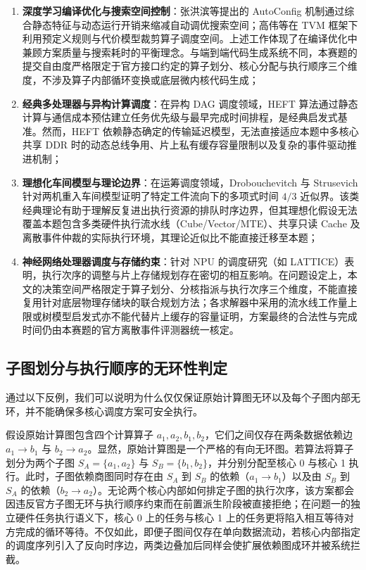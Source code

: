 \documentclass[anonymous,withtoc]{gmcm2026}
\providecommand{\tightlist}{\setlength{\itemsep}{0pt}\setlength{\parskip}{0pt}}
\begin{document}
\begin{enumerate}
\def\labelenumi{\arabic{enumi}.}
\tightlist
\item
  \textbf{深度学习编译优化与搜索空间控制}：张洪滨等提出的 AutoConfig 机制\cite{ref13}通过综合静态特征与动态运行开销来缩减自动调优搜索空间；高伟等在 TVM 框架下\cite{ref14}利用预定义规则与代价模型裁剪算子调度空间。上述工作体现了在编译优化中兼顾方案质量与搜索耗时的平衡理念。与端到端代码生成系统不同，本赛题的提交自由度严格限定于官方接口约定的算子划分、核心分配与执行顺序三个维度，不涉及算子内部循环变换或底层微内核代码生成；
\item
  \textbf{经典多处理器与异构计算调度}：在异构 DAG 调度领域，HEFT 算法\cite{ref15}通过静态计算与通信成本预估建立任务优先级与最早完成时间排程，是经典启发式基准。然而，HEFT 依赖静态确定的传输延迟模型，无法直接适应本题中多核心共享 DDR 时的动态总线争用、片上私有缓存容量限制以及复杂的事件驱动推进机制；
\item
  \textbf{理想化车间模型与理论边界}：在运筹调度领域，Drobouchevitch 与 Strusevich 针对两机重入车间模型\cite{ref16}证明了特定工件流向下的多项式时间 \(4/3\) 近似界。该类经典理论有助于理解反复进出执行资源的排队时序边界，但其理想化假设无法覆盖本题包含多类硬件执行流水线（Cube/Vector/MTE）、共享只读 Cache 及离散事件仲裁的实际执行环境，其理论近似比不能直接迁移至本题；
\item
  \textbf{神经网络处理器调度与存储约束}：针对 NPU 的调度研究（如 LATTICE\cite{ref17}）表明，执行次序的调整与片上存储规划存在密切的相互影响。在问题设定上，本文的决策空间严格限定于算子划分、分核指派与执行次序三个维度，不能直接复用针对底层物理存储块的联合规划方法；各求解器中采用的流水线工作量上限或树模型启发式亦不能代替片上缓存的容量证明，方案最终的合法性与完成时间仍由本赛题的官方离散事件评测器统一核定。
\end{enumerate}

\subsection{子图划分与执行顺序的无环性判定}

通过以下反例，我们可以说明为什么仅仅保证原始计算图无环以及每个子图内部无环，并不能确保多核心调度方案可安全执行。

假设原始计算图包含四个计算算子 \(a_1, a_2, b_1, b_2\)，它们之间仅存在两条数据依赖边 \(a_1 \to b_1\) 与 \(b_2 \to a_2\)。显然，原始计算图是一个严格的有向无环图。若算法将算子划分为两个子图 \(S_A = \{a_1, a_2\}\) 与 \(S_B = \{b_1, b_2\}\)，并分别分配至核心 0 与核心 1 执行。此时，子图依赖商图同时存在由 \(S_A\) 到 \(S_B\) 的依赖（\(a_1 \to b_1\)）以及由 \(S_B\) 到 \(S_A\) 的依赖（\(b_2 \to a_2\)）。无论两个核心内部如何排定子图的执行次序，该方案都会因违反官方子图无环与执行顺序约束而在前置派生阶段被直接拒绝；在问题一的独立硬件任务执行语义下，核心 0 上的任务与核心 1 上的任务更将陷入相互等待对方完成的循环等待。不仅如此，即便子图间仅存在单向数据流动，若核心内部指定的调度序列引入了反向时序边，两类边叠加后同样会使扩展依赖图成环并被系统拦截。
\end{document}
